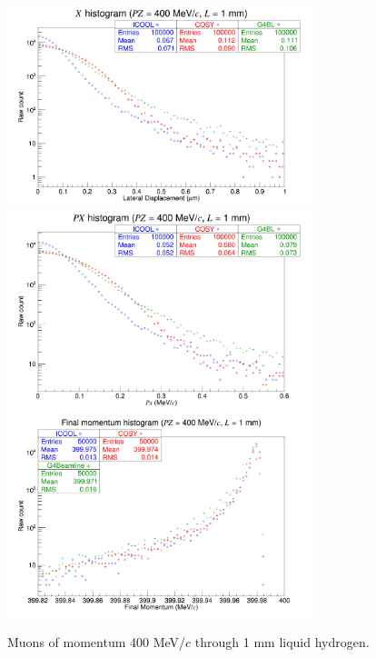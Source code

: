 \begin{figure}[!htb]
  \centering
    \includegraphics[width=0.8\textwidth]{Validation/LH/X.400.1.png} 
    \includegraphics[width=0.8\textwidth]{Validation/LH/PX.400.1.png} 
    \includegraphics[width=0.8\textwidth]{Validation/LH/strag.400.1.png} 
  \caption{Muons of momentum 400 MeV/$c$ through 1 mm liquid hydrogen.}
  \label{fig:400.1}
\end{figure}

